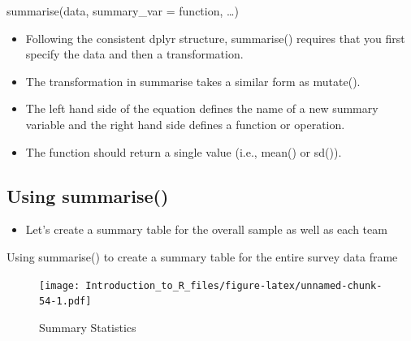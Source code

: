 \documentclass[]{book}
\newenvironment{Shaded}{\begin{snugshade}}{\end{snugshade}}
\newcommand{\DataTypeTok}[1]{\textcolor[rgb]{0.13,0.29,0.53}{#1}}
\newcommand{\KeywordTok}[1]{\textcolor[rgb]{0.13,0.29,0.53}{\textbf{#1}}}
\newcommand{\NormalTok}[1]{#1}
\newcommand{\OperatorTok}[1]{\textcolor[rgb]{0.81,0.36,0.00}{\textbf{#1}}}
\newcommand{\OtherTok}[1]{\textcolor[rgb]{0.56,0.35,0.01}{#1}}
\newcommand{\StringTok}[1]{\textcolor[rgb]{0.31,0.60,0.02}{#1}}
\providecommand{\tightlist}{%
  \setlength{\itemsep}{0pt}\setlength{\parskip}{0pt}}
\theoremstyle{definition}
\theoremstyle{definition}
\theoremstyle{definition}
\theoremstyle{remark}
\let\BeginKnitrBlock\begin \let\EndKnitrBlock\end
\begin{document}
summarise(data, summary\_var = function, \ldots{})

\begin{itemize}
\tightlist
\item
  Following the consistent dplyr structure, summarise() requires that you first specify the data and then a transformation.
\item
  The transformation in summarise takes a similar form as mutate().
\item
  The left hand side of the equation defines the name of a new summary variable and the right hand side defines a function or operation.
\item
  The function should return a single value (i.e., mean() or sd()).
\end{itemize}

\hypertarget{using-summarise}{%
\subsection{Using summarise()}\label{using-summarise}}

\begin{itemize}
\tightlist
\item
  Let's create a summary table for the overall sample as well as each team
\end{itemize}

\BeginKnitrBlock{example}
\protect\hypertarget{exm:sum1}{}{\label{exm:sum1} }Using summarise() to create a summary table for the entire survey data frame
\EndKnitrBlock{example}

\begin{Shaded}
\end{Shaded}

\begin{figure}
\centering
\texttt{[image: Introduction\_to\_R\_files/figure-latex/unnamed-chunk-54-1.pdf]}
\caption{\label{fig:unnamed-chunk-54}Summary Statistics}
\end{figure}
\end{document}

